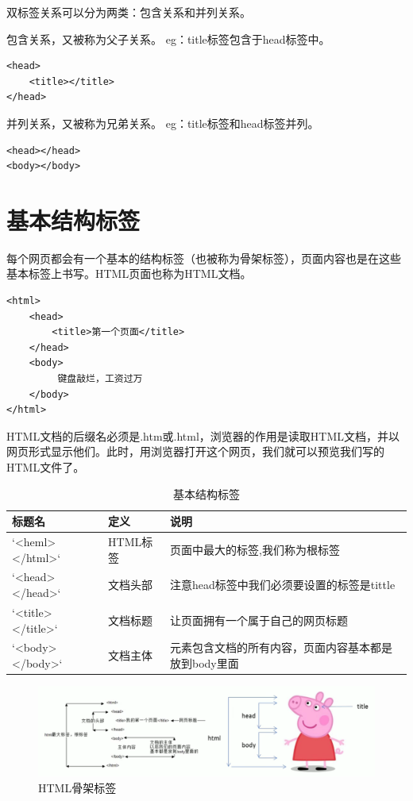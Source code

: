 \documentclass[
]{book}
\begin{document}
双标签关系可以分为两类：包含关系和并列关系。

包含关系，又被称为父子关系。
eg：title标签包含于head标签中。

\begin{verbatim}
<head>
    <title></title>
</head>
\end{verbatim}

并列关系，又被称为兄弟关系。
eg：title标签和head标签并列。

\begin{verbatim}
<head></head>
<body></body>
\end{verbatim}

\hypertarget{ux57faux672cux7ed3ux6784ux6807ux7b7e}{%
\section{基本结构标签}\label{ux57faux672cux7ed3ux6784ux6807ux7b7e}}

每个网页都会有一个基本的结构标签（也被称为骨架标签），页面内容也是在这些基本标签上书写。HTML页面也称为HTML文档。

\begin{verbatim}
<html>
    <head>     
        <title>第一个页面</title> 
    </head>
    <body>
         键盘敲烂，工资过万
    </body>
</html>
\end{verbatim}

HTML文档的后缀名必须是.htm或.html，浏览器的作用是读取HTML文档，并以网页形式显示他们。此时，用浏览器打开这个网页，我们就可以预览我们写的HTML文件了。

\begin{table}

\caption{\label{tab:unnamed-chunk-1}基本结构标签}
\centering
\begin{tabular}[t]{lll}
\toprule
标题名 & 定义 & 说明\\
\midrule
`<heml></html>` & HTML标签 & 页面中最大的标签,我们称为根标签\\
`<head></head>` & 文档头部 & 注意head标签中我们必须要设置的标签是tittle\\
`<title></title>` & 文档标题 & 让页面拥有一个属于自己的网页标题\\
`<body></body>` & 文档主体 & 元素包含文档的所有内容，页面内容基本都是放到body里面\\
\bottomrule
\end{tabular}
\end{table}

\begin{figure}

{\centering \includegraphics{fig/1-2} 

}

\caption{HTML骨架标签}\label{fig:unnamed-chunk-2}
\end{figure}
\end{document}
